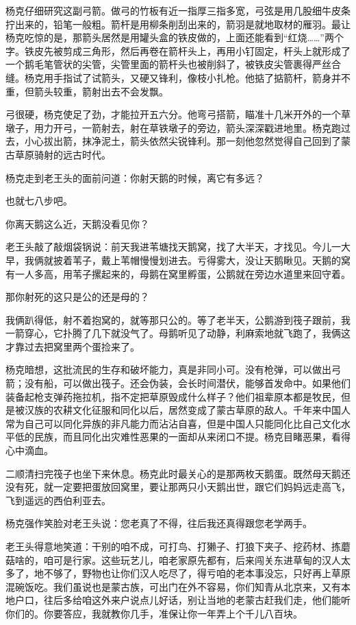 \par 杨克仔细研究这副弓箭。做弓的竹板有近一指厚三指多宽，弓弦是用几股细牛皮条拧出来的，铅笔一般粗。箭杆是用柳条削刮出来的，箭羽是就地取材的雁羽。最让杨克吃惊的是，那箭头居然是用罐头盒的铁皮做的，上面还能看到“红烧……”两个字。铁皮先被剪成三角形，然后再卷在箭杆头上，再用小钉固定，杆头上就形成了一个鹅毛笔管状的尖管，尖管里面的箭杆头也被削斜了，被铁皮尖管裹得严丝合缝。杨克用手指试了试箭头，又硬又锋利，像枝小扎枪。他掂了掂箭杆，箭身并不重，但箭头较重，箭射出去不会发飘。
\par 弓很硬，杨克使足了劲，才能拉开五六分。他弯弓搭箭，瞄准十几米开外的一个草墩子，用力开弓，一箭射去，射在草铁墩子的旁边，箭头深深戳进地里。杨克跑过去，小心拔出箭，抹净泥土，箭头依然尖锐锋利。那一刻他忽然觉得自己回到了蒙古草原骑射的远古时代。
\par 杨克走到老王头的面前问道：你射天鹅的时候，离它有多远？
\par 也就七八步吧。
\par 你离天鹅这么近，天鹅没看见你？
\par 老王头敲了敲烟袋锅说：前天我进苇塘找天鹅窝，找了大半天，才找见。今儿一大早，我俩就披着苇子，戴上苇帽慢慢划进去。亏得雾大，没让天鹅瞅见。天鹅的窝有一人多高，用苇子摞起来的，母鹅在窝里孵蛋，公鹅就在旁边水道里来回守着。
\par 那你射死的这只是公的还是母的？
\par 我俩趴得低，射不着抱窝的，就等那只公的。等了老半天，公鹅游到筏子跟前，我一箭穿心，它扑腾了几下就没气了。母鹅听见了动静，利麻索地就飞跑了，我俩这才靠过去把窝里两个蛋捡来了。
\par 杨克暗想，这批流民的生存和破坏能力，真是非同小可。没有枪弹，可以做出弓箭；没有船，可以做出筏子。还会伪装，会长时间潜伏，能够首发命中。如果他们装备起枪支弹药拖拉机，指不定把草原毁成什么样子？他们祖辈原本都是牧民，但是被汉族的农耕文化征服和同化以后，居然变成了蒙古草原的敌人。千年来中国人常为自己可以同化异族的非凡能力而沾沾自喜，但是中国人只能同化比自己文化水平低的民族，而且同化出灾难性恶果的一面却从来闭口不提。杨克目睹恶果，看得心中滴血。
\par 二顺清扫完筏子也坐下来休息。杨克此时最关心的是那两枚天鹅蛋。既然母天鹅还没有死，就一定要把蛋放回窝里，要让那两只小天鹅出世，跟它们妈妈远走高飞，飞到遥远的西伯利亚去。
\par 杨克强作笑脸对老王头说：您老真了不得，往后我还真得跟您老学两手。
\par 老王头得意地笑道：干别的咱不成，可打鸟、打獭子、打狼下夹子、挖药材、拣蘑菇啥的，咱可是行家。这些玩艺儿，咱老家原先都有，后来闯关东进草甸的汉人太多了，地不够了，野物也让你们汉人吃尽了，得亏咱的老本事没忘，只好再上草原混碗饭吃。我们虽说也是蒙古族，可出门在外不容易，你们知青从北京来，又有本地户口，往后多给咱这外来户说点儿好话，别让当地的老蒙古赶我们走，他们能听你们的。你要答应，我就教你几手，准保让你一年弄上个千儿八百块。
